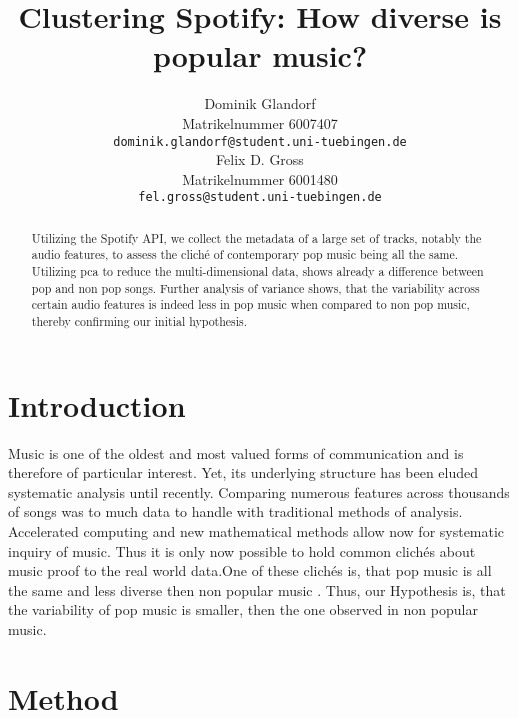 \documentclass{article}
\title{Clustering Spotify: How diverse is popular music?}
\author{%
  Dominik Glandorf\\
  Matrikelnummer 6007407\\
  \texttt{dominik.glandorf@student.uni-tuebingen.de} \\
  \And
  Felix D. Gross\\
  Matrikelnummer 6001480\\
  \texttt{fel.gross@student.uni-tuebingen.de} \\
}
\begin{document}
\maketitle

\begin{abstract}
{Utilizing the Spotify API, we collect the metadata of a large set of tracks, notably the audio features, to assess the cliché of contemporary pop music being all the same.  
  Utilizing pca to reduce the multi-dimensional data, shows already a difference between pop and non pop songs. Further analysis of variance shows, that the variability across certain audio features is indeed less in pop music when compared to non pop music, thereby confirming our initial hypothesis.}
  
\end{abstract}

\section{Introduction}

Music is one of the oldest and most valued forms of communication and is therefore of particular interest. Yet, its underlying structure has been eluded systematic analysis until recently. Comparing numerous features across thousands of songs was to much data to handle with traditional methods of analysis. Accelerated computing and new mathematical methods allow now for systematic inquiry of music. Thus it is only now possible to hold common clichés about music proof to the real world data.\newline One of these clichés is, that pop music is all the same and less diverse then non popular music \citep[see for example][]{serra2012measuring}. Thus, our Hypothesis is, that the variability of pop music is smaller, then the one observed in non popular music.

\section{Method}
\end{document}
